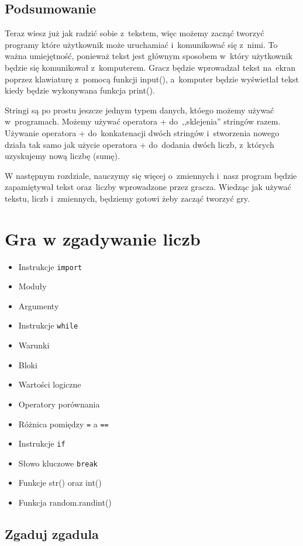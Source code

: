 \documentclass{book}
\newcommand{\btopicscovered}{
	\begin{graybox}
	\begin{itemize}
}
\newcommand{\etopicscovered}{
	\end{itemize}
	\end{graybox}
}
\begin{document}
\section{Podsumowanie}

Teraz wiesz już jak radzić sobie z~tekstem, więc możemy zacząć tworzyć programy które użytkownik może uruchamiać i~komunikować się z~nimi. To ważna umiejętność, ponieważ tekst jest głównym sposobem w~który użytkownik będzie się komunikował z~komputerem. Gracz będzie wprowadzał tekst na~ekran poprzez klawiaturę z~pomocą funkcji input(), a~komputer będzie wyświetlał tekst kiedy będzie wykonywana funkcja print().

Stringi są po prostu jeszcze jednym typem danych, któego możemy używać w~programach. Możemy używać operatora + do~,,sklejenia'' stringów razem. Używanie operatora + do~konkatenacji dwóch stringów i~stworzenia nowego działa tak samo jak użycie operatora + do~dodania dwóch liczb, z~których uzyskujemy nową liczbę (sumę).

W następnym rozdziale, nauczymy się więcej o~zmiennych i~nasz program będzie zapamiętywał tekst oraz~liczby wprowadzone przez gracza. Wiedząc jak używać tekstu, liczb i~zmiennych, będziemy gotowi żeby zacząć tworzyć gry.

\chapter{Gra w zgadywanie liczb}

\btopicscovered
	\item Instrukcje \lstinline{import}
	\item Moduły
	\item Argumenty
	\item Instrukcje \lstinline{while}
	\item Warunki
	\item Bloki
	\item Wartości logiczne
	\item Operatory porównania
	\item Różnica pomiędzy \lstinline{=} a \lstinline{==}
	\item Instrukcje \lstinline{if}
	\item Słowo kluczowe \lstinline{break}
	\item Funkcje str() oraz int()
	\item Funkcja random.randint()
\etopicscovered

\section{Zgaduj zgadula}
\end{document}

